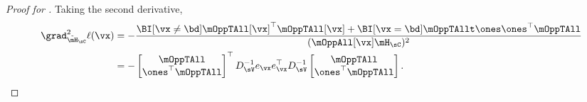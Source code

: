 \begin{proof}[Proof for ]
Taking the second derivative,
\begin{align}
  \grad^2_{\tilde \mH_\sC} \ell(\vx)
  &= -\frac{\BI[\vx \neq \bd] \mOppTAll[\vx]^\top \mOppTAll[\vx] + \BI[\vx = \bd] \mOppTAllt \ones \ones^\top \mOppTAll}{(\mOppAll[\vx] \mH_\sC)^2} \nonumber \\
  &= - 
  \begin{bmatrix}
    \mOppTAll \\
    \ones^\top \mOppTAll
  \end{bmatrix}^\top
    D_{\sV}^{-1} e_\vx e_\vx^\top D_{\sV}^{-1} 
  \begin{bmatrix}
    \mOppTAll \\
    \ones^\top \mOppTAll
  \end{bmatrix}. \label{eqn:lhood-hess}%
\end{align}


\end{proof}
